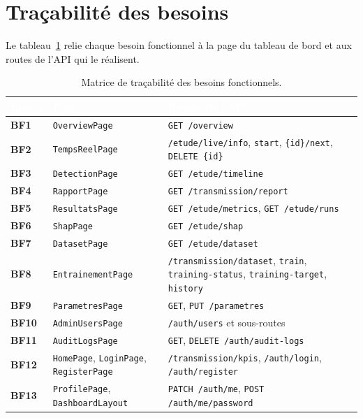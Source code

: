 \section{Traçabilité des besoins}

Le tableau~\ref{tab:trace} relie chaque besoin fonctionnel à la page du
tableau de bord et aux routes de l'API qui le réalisent.

\begin{table}[H]
\centering
\footnotesize
\renewcommand{\arraystretch}{1.35}
\setlength{\arrayrulewidth}{0.8pt}
\caption{Matrice de traçabilité des besoins fonctionnels.}
\label{tab:trace}
\begin{tabularx}{\textwidth}{@{}>{\bfseries}p{1.1cm} >{\raggedright\arraybackslash}p{3.4cm} >{\raggedright\arraybackslash}X@{}}
\rowcolor{thead}
\textcolor{white}{\textbf{Besoin}} & \textcolor{white}{\textbf{Page}} &
\textcolor{white}{\textbf{Routes de l'API}} \\
\hline
BF1 & \texttt{OverviewPage} & \texttt{GET /overview} \\
\rowcolor{trowa}
BF2 & \texttt{TempsReelPage} & \texttt{/etude/live/info}, \texttt{start}, \texttt{\{id\}/next}, \texttt{DELETE \{id\}} \\
BF3 & \texttt{DetectionPage} & \texttt{GET /etude/timeline} \\
\rowcolor{trowa}
BF4 & \texttt{RapportPage} & \texttt{GET /transmission/report} \\
BF5 & \texttt{ResultatsPage} & \texttt{GET /etude/metrics}, \texttt{GET /etude/runs} \\
\rowcolor{trowa}
BF6 & \texttt{ShapPage} & \texttt{GET /etude/shap} \\
BF7 & \texttt{DatasetPage} & \texttt{GET /etude/dataset} \\
\rowcolor{trowa}
BF8 & \texttt{EntrainementPage} & \texttt{/transmission/dataset}, \texttt{train}, \texttt{training-status}, \texttt{training-target}, \texttt{history} \\
BF9 & \texttt{ParametresPage} & \texttt{GET}, \texttt{PUT /parametres} \\
\rowcolor{trowa}
BF10 & \texttt{AdminUsersPage} & \texttt{/auth/users} et sous-routes \\
BF11 & \texttt{AuditLogsPage} & \texttt{GET}, \texttt{DELETE /auth/audit-logs} \\
\rowcolor{trowa}
BF12 & \texttt{HomePage}, \texttt{LoginPage}, \texttt{RegisterPage} & \texttt{/transmission/kpis}, \texttt{/auth/login}, \texttt{/auth/register} \\
BF13 & \texttt{ProfilePage}, \texttt{DashboardLayout} & \texttt{PATCH /auth/me}, \texttt{POST /auth/me/password} \\
\hline
\end{tabularx}
\end{table}

